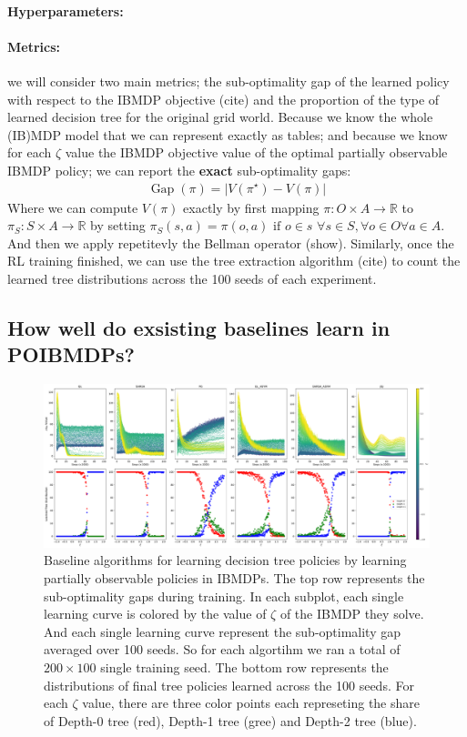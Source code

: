 \paragraph{Hyperparameters:}

\paragraph{Metrics:} we will consider two main metrics; the sub-optimality gap of the learned policy with respect to the IBMDP objective (cite) and the proportion of the type of learned decision tree for the original grid world.
Because we know the whole (IB)MDP model that we can represent exactly as tables; and because we know for each $\zeta$ value the IBMDP objective value of the optimal partially observable IBMDP policy; we can report the \textbf{exact} sub-optimality gaps:
\begin{align*}
    \operatorname{Gap}(\pi) = |V(\pi^{\star}) - V(\pi)|
\end{align*}
Where we can compute $V(\pi)$ exactly by first mapping $\pi : O \times A \rightarrow \mathbb{R}$ to $\pi_{S} : S \times A \rightarrow \mathbb{R}$ by setting $\pi_S (s, a) = \pi(o,a) \text{ if }o\in s$ $\forall s \in S, \forall o \in O \forall a \in A$.
And then we apply repetitevly the Bellman operator (show).
Similarly, once the RL training finished, we can use the tree extraction algorithm (cite) to count the learned tree distributions across the 100 seeds of each experiment.

\subsection{How well do exsisting baselines learn in POIBMDPs?}

\begin{figure}
    \centering
    \includegraphics[width=1\textwidth]{images/images_part1/quick_plot_combined_all.pdf}
    \caption{Baseline algorithms for learning decision tree policies by learning partially observable policies in IBMDPs. 
    The top row represents the sub-optimality gaps during training. In each subplot, each single learning curve is colored by the value of $\zeta$ of the IBMDP they solve. And each single learning curve represent the sub-optimality gap averaged over 100 seeds.
    So for each algortihm we ran a total of $200 \times 100$ single training seed.
    The bottom row represents the distributions of final tree policies learned across the 100 seeds.
    For each $\zeta$ value, there are three color points each represeting the share of Depth-0 tree (red), Depth-1 tree (gree) and Depth-2 tree (blue).
    }\label{fig:rl-poibmdp}
\end{figure}

